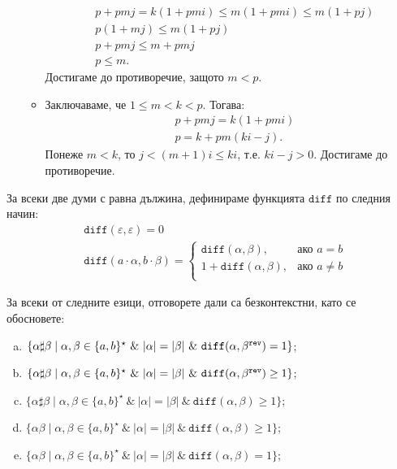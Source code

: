 \begin{hint}
\begin{itemize}
\begin{itemize}
\begin{align*}
        & p + pmj = k(1+pmi) \leq m(1+pmi) \leq m(1+pj)\\
        & p(1+mj) \leq m(1+pj)\\
        & p + pmj \leq m + pmj\\
        & p \leq m.
      \end{align*}
      Достигаме до противоречие, защото $m < p$.
    \item
      Заключаваме, че $1 \leq m < k < p$. Тогава:
      \begin{align*}
        & p + pmj = k(1+pmi)\\
        & p = k + pm(ki-j).
      \end{align*}
      Понеже $m < k$, то $j < (m+1)i \leq ki$,
      т.е. $ki-j > 0$. Достигаме до противоречие.
    \end{itemize}
  \end{itemize}
\end{hint}
\fi

За всеки две думи с равна дължина, дефинираме функцията $\texttt{diff}$ по следния начин:
\begin{align*}
  & \texttt{diff}(\varepsilon,\varepsilon) = 0\\
  & \texttt{diff}(a \cdot \alpha, b\cdot \beta) =
    \begin{cases}
      \texttt{diff}(\alpha,\beta), & \text{ако }a = b\\
      1 + \texttt{diff}(\alpha,\beta), & \text{ако }a \neq b\\
    \end{cases}
\end{align*}

\begin{problem}
  За всеки от следните езици, отговорете дали са безконтекстни, като се обосновете:
  \begin{enumerate}[a)]
  \item 
    \ifhints
    \fi
    $\{\alpha \sharp \beta \mid \alpha,\beta \in \{a,b\}^\star\ \&\ |\alpha| = |\beta|\ \&\ \texttt{diff}(\alpha,\beta^{\rev}) = 1\}$;
  \item
    \ifhints
    \fi
    $\{\alpha \sharp \beta \mid \alpha, \beta \in \{a,b\}^\star\ \&\ |\alpha| = |\beta|\ \&\ \texttt{diff}(\alpha,\beta^{\rev}) \geq 1\}$;
  \item
    \ifhints 
    \fi
    $\{\alpha \sharp \beta \mid \alpha, \beta \in \{a,b\}^\star\ \&\ |\alpha| = |\beta|\ \&\ \texttt{diff}(\alpha,\beta) \geq 1\}$;
  \item
    \ifhints 
    \fi
    $\{\alpha\beta \mid \alpha, \beta \in \{a,b\}^\star\ \&\ |\alpha| = |\beta|\ \&\ \texttt{diff}(\alpha,\beta) \geq 1\}$;
  \item
    \ifhints
    \fi
    $\{\alpha\beta \mid \alpha, \beta \in \{a,b\}^\star\ \&\ |\alpha| = |\beta|\ \&\ \texttt{diff}(\alpha,\beta) = 1\}$;
  \end{enumerate}
\end{problem}    

